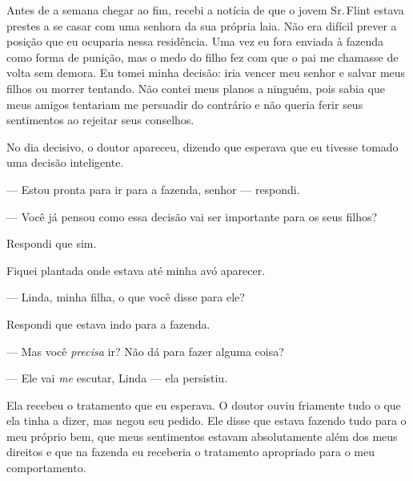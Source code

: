 Antes de a semana chegar ao fim, recebi
a notícia de que o jovem Sr.\,Flint estava prestes a se casar com uma
senhora da sua própria laia. Não era difícil prever a posição que eu
ocuparia nessa residência. Uma vez eu fora enviada à fazenda como forma
de punição, mas o medo do filho fez com que o pai me chamasse de volta
sem demora. Eu tomei minha decisão: iria vencer meu senhor e salvar meus
filhos ou morrer tentando. Não contei meus planos a ninguém, pois sabia
que meus amigos tentariam me persuadir do contrário e não queria ferir
seus sentimentos ao rejeitar seus conselhos.

No dia decisivo, o doutor apareceu,
dizendo que esperava que eu tivesse tomado uma decisão inteligente.

--- Estou pronta para ir para a
fazenda, senhor --- respondi.

--- Você já pensou como essa decisão
vai ser importante para os seus filhos?

Respondi que sim.


Fiquei plantada onde estava até minha
avó aparecer.

--- Linda, minha filha, o que você disse para ele?

Respondi que estava indo para a
fazenda.

--- Mas você \emph{precisa} ir? Não dá
para fazer alguma coisa?


--- Ele vai \emph{me} escutar, Linda --- ela persistiu.

Ela recebeu o tratamento que eu esperava. O doutor ouviu friamente tudo
o que ela tinha a dizer, mas negou seu pedido. Ele disse que estava
fazendo tudo para o meu próprio bem, que meus sentimentos estavam
absolutamente além dos meus direitos e que na fazenda eu receberia o
tratamento apropriado para o meu comportamento.

